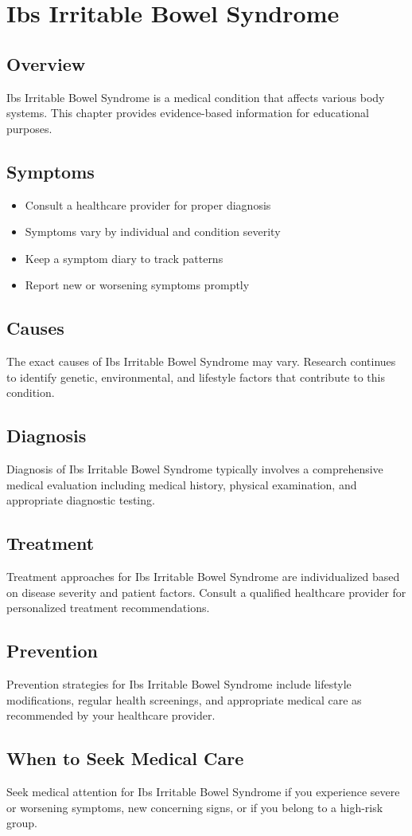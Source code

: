 \chapter{Ibs Irritable Bowel Syndrome}

\section*{Overview}
Ibs Irritable Bowel Syndrome is a medical condition that affects various body systems. This chapter provides evidence-based information for educational purposes.

\section*{Symptoms}
\begin{itemize}
  \item Consult a healthcare provider for proper diagnosis
  \item Symptoms vary by individual and condition severity
  \item Keep a symptom diary to track patterns
  \item Report new or worsening symptoms promptly
\end{itemize}

\section*{Causes}
The exact causes of Ibs Irritable Bowel Syndrome may vary. Research continues to identify genetic, environmental, and lifestyle factors that contribute to this condition.

\section*{Diagnosis}
Diagnosis of Ibs Irritable Bowel Syndrome typically involves a comprehensive medical evaluation including medical history, physical examination, and appropriate diagnostic testing.

\section*{Treatment}
Treatment approaches for Ibs Irritable Bowel Syndrome are individualized based on disease severity and patient factors. Consult a qualified healthcare provider for personalized treatment recommendations.

\section*{Prevention}
Prevention strategies for Ibs Irritable Bowel Syndrome include lifestyle modifications, regular health screenings, and appropriate medical care as recommended by your healthcare provider.

\section*{When to Seek Medical Care}
Seek medical attention for Ibs Irritable Bowel Syndrome if you experience severe or worsening symptoms, new concerning signs, or if you belong to a high-risk group.
\clearpage
